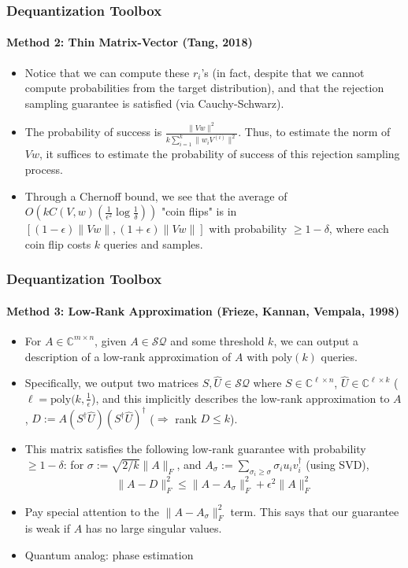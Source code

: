 \documentclass{beamer}
\newcommand\0{\mathbf{0}}
\newcommand\CC{\mathbb{C}}
\newcommand\<{\langle}
\renewcommand\>{\rangle}
\renewcommand\implies{\Rightarrow}
\begin{document}
\begin{frame}
\frametitle{Dequantization Toolbox}
\framesubtitle{Method 2: Thin Matrix-Vector (Tang, 2018)}
\begin{itemize}
\item Notice that we can compute these $r_i$'s (in fact, despite that we cannot compute probabilities from the target distribution), and that the rejection sampling guarantee is satisfied (via Cauchy-Schwarz).

\item The probability of success is $\frac{\|Vw\|^2}{k\sum_{i=1}^k\|w_iV^{(i)}\|^2}$. Thus, to estimate the norm of $Vw$, it suffices to estimate the probability of success of this rejection sampling process.

\item Through a Chernoff bound, we see that the average of $O(kC(V,w)(\frac{1}{\epsilon^2}\log\frac{1}{\delta}))$ "coin flips" is in $[(1-\epsilon)\|Vw\|,(1+\epsilon)\|Vw\|]$ with probability $\geq 1-\delta$, where each coin flip costs $k$ queries and samples.	
\end{itemize}
\end{frame}


\begin{frame}
\frametitle{Dequantization Toolbox}
\framesubtitle{Method 3: Low-Rank Approximation (Frieze, Kannan, Vempala, 1998)}
\begin{itemize}
\item For $A \in \CC^{m\times n}$, given $A \in \mathcal{SQ}$ and some threshold $k$, we can output a description of a low-rank approximation of $A$ with $\text{poly}(k)$ queries.
\item Specifically, we output two matrices $S,\hat{U}\in \mathcal{SQ}$ where $S \in \CC^{\ell \times n}$, $\hat{U} \in \CC^{\ell \times k}$ ($\ell = \text{poly}(k,\frac{1}{\epsilon}$), and this implicitly describes the low-rank approximation to $A$, $D := A(S^\dagger\hat{U})(S^\dagger\hat{U})^\dag$ ($\implies$ rank $D \leq k$).

\item This matrix satisfies the following low-rank guarantee with probability $\geq 1-\delta$: for $\sigma := \sqrt{2/k}\|A\|_F$, and $A_{\sigma} := \sum_{\sigma_i \geq \sigma} \sigma_iu_iv_i^\dag$ (using SVD), 
$$\|A - D\|_F^2 \leq \|A - A_\sigma\|_F^2 + \epsilon^2\|A\|_F^2$$
\item Pay special attention to the $\|A - A_\sigma\|_F^2$ term. This says that our guarantee is weak if $A$ has no large singular values. 
\item Quantum analog: phase estimation
\end{itemize}
\end{frame}
\end{document}
